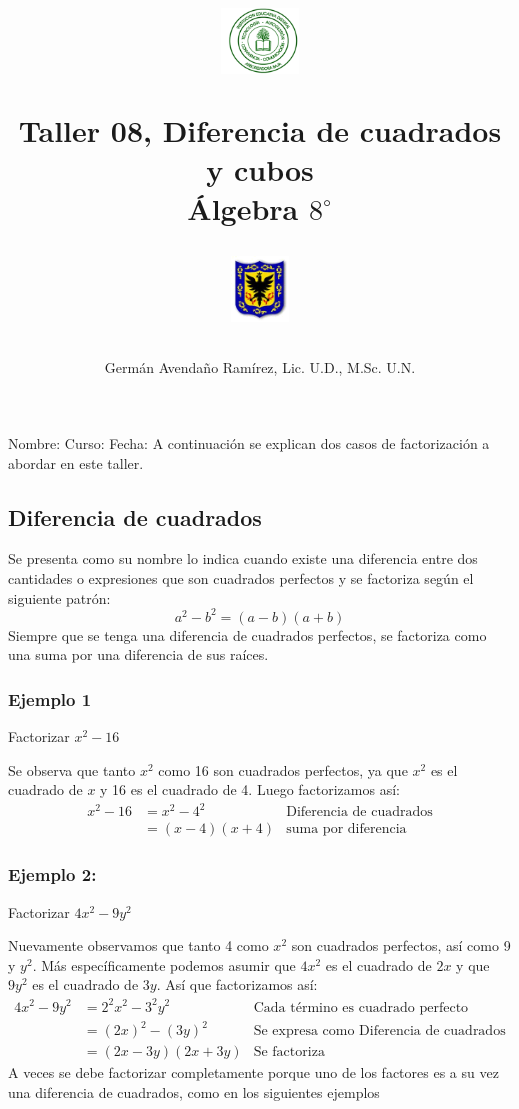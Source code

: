 \documentclass[10pt,twoside]{article}
\author{Germ\'an Avenda\~no Ram\'irez, Lic. U.D., M.Sc. U.N.}
\title{\begin{minipage}{.2\textwidth}
\includegraphics[height=1.75cm]{Images/logo-colegio.png}\end{minipage}
\begin{minipage}{.55\textwidth}
\begin{center}
Taller 08, Diferencia de cuadrados y cubos\\
Álgebra $8^{\circ}$
\end{center}
\end{minipage}\hfill
\begin{minipage}{.2\textwidth}
\includegraphics[height=1.75cm]{Images/logo-sed.png} 
\end{minipage}}
\date{}
\begin{document}
\maketitle
Nombre: \hrulefill Curso: \underline{\hspace*{44pt}} Fecha: \underline{\hspace*{2.5cm}}
A continuaci\'{o}n se explican dos casos de factorizaci\'{o}n a abordar en este taller.
\subsection*{Diferencia de cuadrados}
Se presenta como su nombre lo indica cuando existe una diferencia entre dos cantidades o expresiones que son cuadrados perfectos y se factoriza seg\'{u}n el siguiente patr\'{o}n:
\[a^{2}-b^{2}=(a-b)(a+b)\]
Siempre que se tenga una diferencia de cuadrados perfectos, se factoriza como una suma por una diferencia de sus ra\'{i}ces.
\subsubsection*{Ejemplo 1}
Factorizar $x^{2}-16$

Se observa que tanto $x^{2}$ como 16 son cuadrados perfectos, ya que $x^{2}$ es el cuadrado de $x$ y 16 es el cuadrado de 4. Luego factorizamos as\'{i}:
\begin{align*}
x^{2}-16&=x^{2}-4^{2} & \mbox{Diferencia de cuadrados}\\
&=(x-4)(x+4) & \mbox{suma por diferencia}
\end{align*}
\subsubsection*{Ejemplo 2:}
Factorizar $4x^{2}-9y^{2}$

Nuevamente observamos que tanto 4 como $x^{2}$ son cuadrados perfectos, as\'{i} como 9 y $y^{2}$. M\'{a}s espec\'{i}ficamente podemos asumir que $4x^{2}$ es el cuadrado de $2x$ y que $9y^{2}$ es el cuadrado de $3y$. As\'{i} que factorizamos as\'{i}:
\begin{align*}
4x^{2}-9y^{2}&=2^{2}x^{2}-3^{2}y^{2} & \mbox{Cada término es cuadrado perfecto}\\
&=(2x)^{2}-(3y)^{2}& \mbox{Se expresa como Diferencia de cuadrados}\\
&=(2x-3y)(2x+3y) & \mbox{Se factoriza}
\end{align*}
A veces se debe factorizar completamente porque uno de los factores es a su vez una diferencia de cuadrados, como en los siguientes ejemplos
\end{document}
